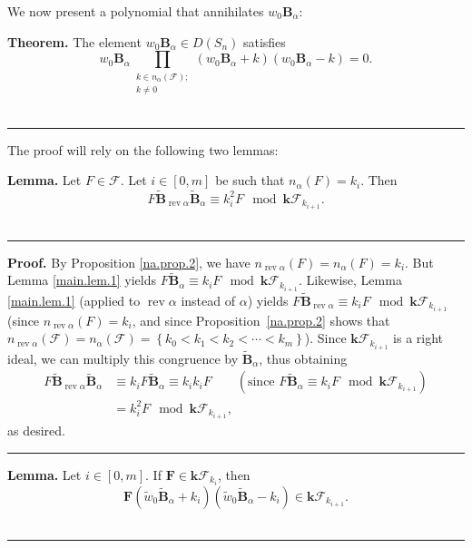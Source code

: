 \documentclass[12pt]{article}
\theoremstyle{definition}%
\newtheorem{thm}{Theorem}[section]
\newtheorem{lem}[thm]{Lemma}
\theoremstyle{definition}%
\theoremstyle{remark}%
\newcommand{\tup}[1]{\left( #1 \right)}
\newcommand{\interval}[1]{\left[ #1 \right]} %
\newcommand{\set}[1]{\left\{ #1 \right\}}
\newcommand{\kk}{\mathbf{k}}
\newcommand{\kf}{\kk\mathcal{F}}
\newcommand{\dsn}{D\left(S_n\right)}
\newcommand{\BBa}{\mathbf{B}_{\alpha}}
\newcommand{\BBt}{\widetilde{\mathbf{B}}}
\newcommand{\BBta}{\widetilde{\mathbf{B}}_{\alpha}}
\newcommand{\FF}{\mathbf{F}}
\newcommand{\CF}{\mathcal{F}}
\newcommand{\wo}{w_0} %
\newcommand{\wotil}{\widetilde{w}_0}
\newcommand{\na}{n_{ \alpha } }%
\newcommand{\rev}{\operatorname{rev}}
\newenvironment{thm}[1][Theorem]{\noindent\textbf{#1.} }{\ \rule{0.5em}{0.5em}}
\newenvironment{lem}[1][Lemma]{\noindent\textbf{#1.} }{\ \rule{0.5em}{0.5em}}
\newenvironment{proof}[1][Proof]{\noindent\textbf{#1.} }{\ \rule{0.5em}{0.5em}}
\begin{document}
We now present a polynomial that annihilates $\wo \BBa$:

\begin{thm}
\label{thm.main.1}
    The element $\wo \BBa \in \dsn$ satisfies
    \begin{equation}
    \wo \BBa\prod_{\substack{k \in \na\tup{\CF}; \\ k \ne 0}}\tup{\wo\BBa + k}\tup{\wo\BBa - k} = 0.
    \label{eq.main.1}
    \end{equation}
\end{thm}

The proof will rely on the following two lemmas:

\begin{lem}
    \label{main.cor.1}
    Let $ F \in \CF $. Let $i \in \interval{0, m}$ be such that $ \na\tup{ F } = k_i $. Then
    \[
    F \BBt_{\rev \alpha} \BBta \equiv k_i^2 F \mod \kf_{k_{i+1}}.
    \]
\end{lem}

\begin{proof}
    By Proposition \ref{na.prop.2}, we have
	$n_{\rev \alpha}\tup{ F } = \na\tup{ F } = k_i$.
	But Lemma \ref{main.lem.1} yields
	$F \BBta \equiv k_i F \mod \kf_{k_{i+1}}$.
	Likewise, Lemma \ref{main.lem.1} (applied to $\rev \alpha$ instead of $\alpha$) yields
	$F \BBt_{\rev \alpha} \equiv k_i F \mod \kf_{k_{i+1}}$
	(since $n_{\rev \alpha}\tup{ F } = k_i$, and since Proposition~\ref{na.prop.2} shows that $n_{\rev \alpha}\tup{\CF} = \na\tup{\CF} = \set{k_0 < k_1 < k_2 < \cdots < k_m}$).
    Since $\kf_{k_{i+1}}$ is a right ideal, we can multiply this congruence by $\BBta$, thus obtaining
    \begin{align*}
    F \BBt_{\rev \alpha} \BBta
	&\equiv k_i F \BBta
    \equiv k_i k_i F  \qquad \tup{\text{since } F \BBta \equiv k_i F \mod \kf_{k_{i+1}}}
    \\
    &= k_i^2 F \mod \kf_{k_{i+1}},
    \end{align*}
    as desired.
\end{proof}



\begin{lem}
    \label{main.lem.2}
    Let $i \in \interval{0, m}$. If $ \FF \in \kf_{k_i} $, then 
    \[
        \FF\tup{ \wotil \BBta + k_i }\tup{ \wotil \BBta - k_i } \in \kf_{k_{i+1}}.
    \]
\end{lem}
\end{document}
